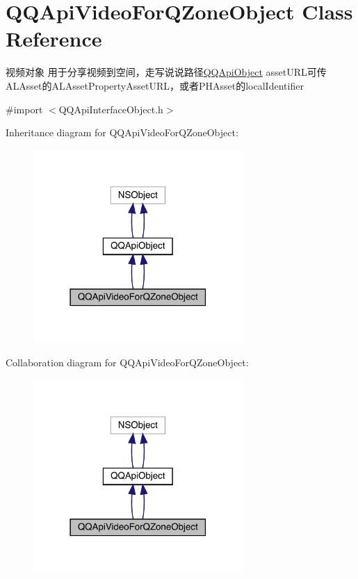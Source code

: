 \hypertarget{interface_q_q_api_video_for_q_zone_object}{}\section{Q\+Q\+Api\+Video\+For\+Q\+Zone\+Object Class Reference}
\label{interface_q_q_api_video_for_q_zone_object}


视频对象 用于分享视频到空间，走写说说路径{\ttfamily \mbox{\hyperlink{interface_q_q_api_object}{Q\+Q\+Api\+Object}}} asset\+U\+R\+L可传\+A\+L\+Asset的\+A\+L\+Asset\+Property\+Asset\+U\+R\+L，或者\+P\+H\+Asset的local\+Identifier  




{\ttfamily \#import $<$Q\+Q\+Api\+Interface\+Object.\+h$>$}



Inheritance diagram for Q\+Q\+Api\+Video\+For\+Q\+Zone\+Object\+:\nopagebreak
\begin{figure}[H]
\begin{center}
\leavevmode
\includegraphics[width=226pt]{interface_q_q_api_video_for_q_zone_object__inherit__graph}
\end{center}
\end{figure}


Collaboration diagram for Q\+Q\+Api\+Video\+For\+Q\+Zone\+Object\+:\nopagebreak
\begin{figure}[H]
\begin{center}
\leavevmode
\includegraphics[width=226pt]{interface_q_q_api_video_for_q_zone_object__coll__graph}
\end{center}
\end{figure}
